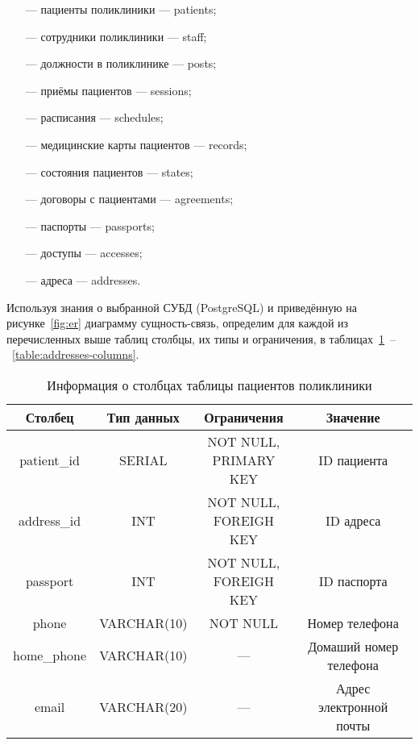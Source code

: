 \begin{itemize}[leftmargin=1.6\parindent]
	\item[---] пациенты поликлиники --- patients;
	\item[---] сотрудники поликлиники --- staff;
	\item[---] должности в поликлинике --- posts;
	\item[---] приёмы пациентов --- sessions;
	\item[---] расписания --- schedules;
	\item[---] медицинские карты пациентов --- records;
	\item[---] состояния пациентов --- states;
	\item[---] договоры с пациентами --- agreements;
	\item[---] паспорты --- passports;
	\item[---] доступы --- accesses;
	\item[---] адреса --- addresses.
\end{itemize}

Используя знания о выбранной СУБД (PostgreSQL) и приведённую на рисунке~\ref{fig:er} диаграмму сущность-связь, определим для каждой из перечисленных выше таблиц столбцы, их типы и ограничения, в таблицах~\ref{table:patients-columns}~--~\ref{table:addresses-columns}.

\begin{table}[H]
\begin{center}
	\captionsetup{justification=raggedright,singlelinecheck=off,margin=5mm}
	\caption{Информация о столбцах таблицы пациентов поликлиники}
	\begin{tabular}{| c | c | c | c |}
		\hline
		Столбец & Тип данных & Ограничения & Значение \\
		\hline
		patient\_id & SERIAL & \makecell{NOT NULL, \\ PRIMARY KEY} & ID пациента \\
		\hline
		address\_id & INT & \makecell{NOT NULL, \\ FOREIGH KEY} & ID  адреса \\
		\hline
		passport & INT & \makecell{NOT NULL, \\ FOREIGH KEY} & ID паспорта \\
		\hline
		phone & VARCHAR(10) & NOT NULL & Номер телефона \\
		\hline
		home\_phone & VARCHAR(10) & --- & Домаший номер телефона \\
		\hline
		email & VARCHAR(20) & --- & Адрес электронной почты \\
		\hline
	\end{tabular}
	\label{table:patients-columns}
\end{center}
\end{table}

